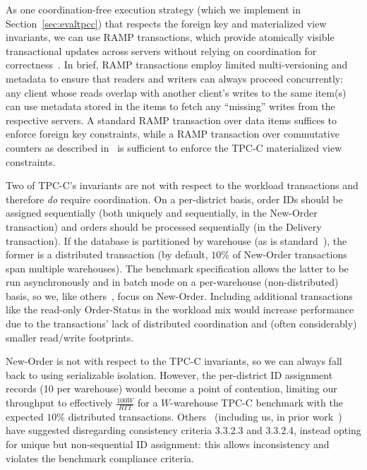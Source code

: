 As one coordination-free execution strategy (which we implement in
Section~\ref{sec:evaltpcc}) that respects the foreign key and
materialized view invariants, we can use RAMP transactions, which
provide atomically visible transactional updates across servers
without relying on coordination for correctness~\cite{ramp-txns}. In
brief, RAMP transactions employ limited multi-versioning and metadata
to ensure that readers and writers can always proceed concurrently:
any client whose reads overlap with another client's writes to the
same item(s) can use metadata stored in the items to fetch any
``missing'' writes from the respective servers. A standard RAMP
transaction over data items suffices to enforce foreign key
constraints, while a RAMP transaction over commutative counters as
described in~\cite{ramp-txns} is sufficient to enforce the TPC-C
materialized view constraints.

Two of TPC-C's invariants are not \iconfluent with respect to the
workload transactions and therefore \textit{do} require
coordination. On a per-district basis, order IDs should be assigned
sequentially (both uniquely and sequentially, in the New-Order
transaction) and orders should be processed sequentially (in the
Delivery transaction). If the database is partitioned by warehouse (as
is standard~\cite{silo,calvin,hstore}), the former is a distributed
transaction (by default, $10\%$ of New-Order transactions span
multiple warehouses). The benchmark specification allows the latter to
be run asynchronously and in batch mode on a per-warehouse
(non-distributed) basis, so we, like others~\cite{calvin,silo}, focus
on New-Order. Including additional transactions like the read-only
Order-Status in the workload mix would increase performance due to the
transactions' lack of distributed coordination and (often
considerably) smaller read/write footprints.

 New-Order is not
\iconfluent with respect to the TPC-C invariants, so we can always
fall back to using serializable isolation. However, the per-district
ID assignment records (10 per warehouse) would become a point of contention,
limiting our throughput to effectively $\frac{100W}{RTT}$ for a
$W$-warehouse TPC-C benchmark with the expected $10\%$ distributed
transactions. Others~\cite{silo} (including us, in prior
work~\cite{hat-vldb}) have suggested disregarding consistency criteria
3.3.2.3 and 3.3.2.4, instead opting for unique but non-sequential ID
assignment: this allows inconsistency and violates the benchmark
compliance criteria.

